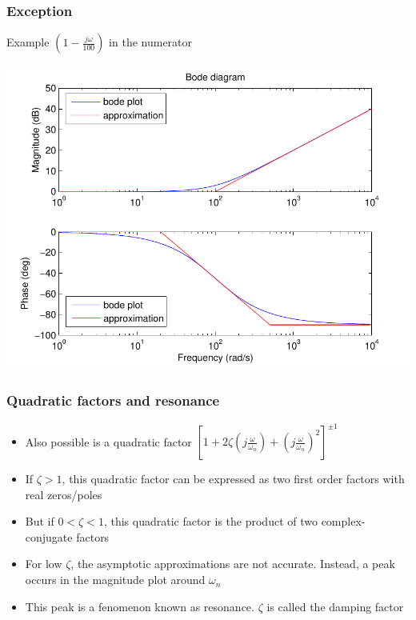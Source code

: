 \begin{frame}
\frametitle{Exception}
Example $(1 - \frac{j\omega}{100})$ in the numerator

\begin{center}
\includegraphics[scale=0.5]{BodeException}
\end{center}

\end{frame}


\begin{frame}
\frametitle{Quadratic factors and resonance}
\begin{itemize}
\item Also possible is a quadratic factor $[1 + 2\zeta(j\frac{\omega}{\omega_n}) +  (j\frac{\omega}{\omega_n})^2]^{\pm1}$
\item If $\zeta > 1$, this quadratic factor can be expressed as two first order factors with real zeros/poles
\item But if $0 < \zeta < 1 $, this quadratic factor is the product of two complex-conjugate factors
\item For low $\zeta$, the asymptotic approximations are not accurate. Instead, a peak occurs in the magnitude plot around $\omega_n$
\item This peak is a fenomenon known as resonance. $\zeta$ is called the damping factor
\end{itemize}

\end{frame}

